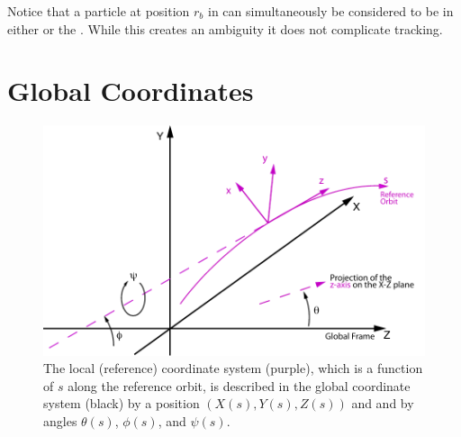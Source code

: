Notice that a particle at position $r_b$ in  can simultaneously be considered to
be in either  or the . While this creates an ambiguity it does not complicate
tracking.

\section{Global Coordinates}
\label{s:global}

\begin{figure}[tb]
  \centering
  \includegraphics{global-coords.pdf}
  \caption[The Global Coordinate System]{
The local (reference) coordinate system (purple), which is a function of $s$ along the reference
orbit, is described in the global coordinate system (black) by a position $(X(s), Y(s), Z(s))$ and
and by angles $\theta(s)$, $\phi(s)$, and $\psi(s)$.
  }
  \label{f:global.coords}
\end{figure}

